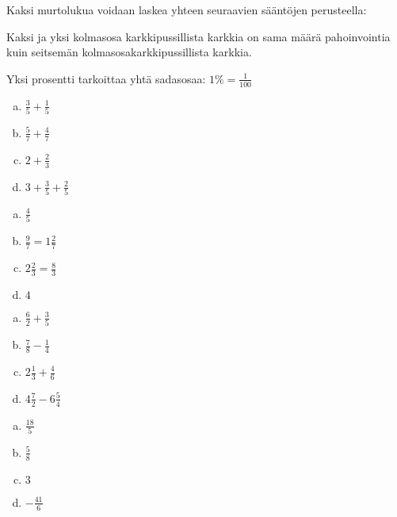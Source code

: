     Kaksi murtolukua voidaan laskea yhteen seuraavien sääntöjen perusteella:
    
    
    
    Kaksi ja yksi kolmasosa karkkipussillista karkkia on sama määrä pahoinvointia
    kuin seitsemän kolmasosakarkkipussillista karkkia.
    
    
    Yksi prosentti tarkoittaa yhtä sadasosaa: $1 \% = \frac{1}{100}$
    
    
    \begin{multicols}{2}
        \begin{tehtava}
            \begin{enumerate}[a)]
        	\item $\frac{3}{5} + \frac{1}{5}$
        	\item $\frac{5}{7} + \frac{4}{7}$
        	\item $2 + \frac{2}{3}$
        	\item$3 + \frac{3}{5} + \frac{2}{5}$   
            \end{enumerate}
            \begin{vastaus}
        		\begin{enumerate}[(a)]
        			\item $\frac{4}{5}$
        			\item $\frac{9}{7} = 1 \frac{2}{7}$
        			\item $2 \frac{2}{3} = \frac{8}{3}$
        			\item $4$
        		\end{enumerate}
            \end{vastaus}
        \end{tehtava}
        
        \begin{tehtava}
        
        \begin{enumerate}[a)]
        	\item $\frac{6}{2} + \frac{3}{5}$
        	\item $\frac{7}{8} - \frac{1}{4}$
        	\item $2 \frac{1}{3} + \frac{4}{6}$
        	\item $4 \frac{7}{2} - 6 \frac{5}{4}$
        \end{enumerate}
            \begin{vastaus}		
        		\begin{enumerate}[a)]
        			\item $\frac{18}{5}$
        			\item $\frac{5}{8}$
        			\item $3$
        			\item $-\frac{41}{6}$ 
        		\end{enumerate}
            \end{vastaus}
        \end{tehtava}
        

\end{multicols}
